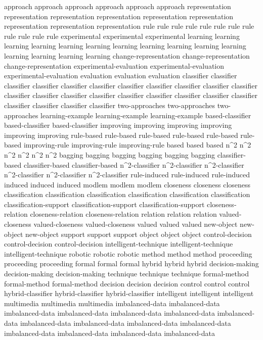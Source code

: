 approach	approach	approach	approach	approach	approach	
representation	representation	representation	representation	representation	representation	representation	representation	representation	
rule	rule	rule	rule	rule	rule	rule	rule	rule	rule	rule	rule	
experimental	experimental	experimental	
learning	learning	learning	learning	learning	learning	learning	learning	learning	learning	learning	learning	learning	learning	learning	
change-representation	change-representation	change-representation	
experimental-evaluation	experimental-evaluation	experimental-evaluation	
evaluation	evaluation	evaluation	
classifier	classifier	classifier	classifier	classifier	classifier	classifier	classifier	classifier	classifier	classifier	classifier	classifier	classifier	classifier	classifier	classifier	classifier	classifier	classifier	classifier	classifier	classifier	classifier	
two-approaches	two-approaches	two-approaches	
learning-example	learning-example	learning-example	
based-classifier	based-classifier	based-classifier	
improving	improving	improving	improving	improving	improving	
rule-based	rule-based	rule-based	rule-based	rule-based	rule-based	
improving-rule	improving-rule	improving-rule	
based	based	based	
n^2	n^2	n^2	n^2	n^2	n^2	
bagging	bagging	bagging	bagging	bagging	bagging	
classifier-based	classifier-based	classifier-based	
n^2-classifier	n^2-classifier	n^2-classifier	n^2-classifier	n^2-classifier	n^2-classifier	
rule-induced	rule-induced	rule-induced	
induced	induced	induced	
modlem	modlem	modlem	
closeness	closeness	closeness	
classification	classification	classification	classification	classification	classification	
classification-support	classification-support	classification-support	
closeness-relation	closeness-relation	closeness-relation	
relation	relation	relation	
valued-closeness	valued-closeness	valued-closeness	
valued	valued	valued	
new-object	new-object	new-object	
support	support	support	
object	object	object	
control-decision	control-decision	control-decision	
intelligent-technique	intelligent-technique	intelligent-technique	
robotic	robotic	robotic	
method	method	method	
proceeding	proceeding	proceeding	
formal	formal	formal	
hybrid	hybrid	hybrid	
decision-making	decision-making	decision-making	
technique	technique	technique	
formal-method	formal-method	formal-method	
decision	decision	decision	
control	control	control	
hybrid-classifier	hybrid-classifier	hybrid-classifier	
intelligent	intelligent	intelligent	
multimedia	multimedia	multimedia	
imbalanced-data	imbalanced-data	imbalanced-data	imbalanced-data	imbalanced-data	imbalanced-data	imbalanced-data	imbalanced-data	imbalanced-data	imbalanced-data	imbalanced-data	imbalanced-data	imbalanced-data	imbalanced-data	imbalanced-data	
